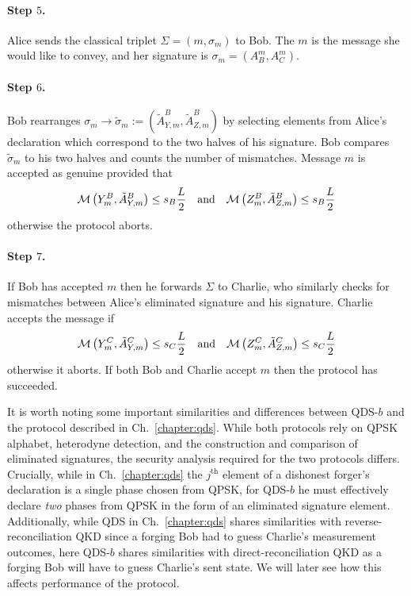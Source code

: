 \paragraph{Step $5$.} Alice sends the classical triplet $\Sigma = \left(m, \sigma_m\right)$ to Bob. The $m$ is the message she would like to convey, and her signature is $\sigma_m = \left(A_B^m, A_C^m\right)$. 

\paragraph{Step $6$.} Bob rearranges $\sigma_m \rightarrow \tilde{\sigma}_m := \left(\tilde{A}_{Y, m}^B, \tilde{A}_{Z, m}^B\right)$ by selecting elements from Alice's declaration which correspond to the two halves of his signature. Bob compares $\tilde{\sigma}_m$ to his two halves and counts the number of mismatches. Message $m$ is accepted as genuine provided that
\begin{equation}
\mathcal{M}\left(Y_m^B, \tilde{A}_{Y, m}^B\right) \le s_B \frac{L}{2} \qq{and} \mathcal{M}\left(Z_m^B, \tilde{A}_{Z, m}^B\right) \le s_B \frac{L}{2}
\end{equation}
otherwise the protocol aborts. %

\paragraph{Step $7$.} If Bob has accepted $m$ then he forwards $\Sigma$ to Charlie, who similarly checks for mismatches between Alice's eliminated signature and his signature. Charlie accepts the message if
\begin{equation}
\mathcal{M}\left(Y_m^C, \tilde{A}_{Y, m}^C\right) \le s_C \frac{L}{2} \qq{and} \mathcal{M}\left(Z_m^C, \tilde{A}_{Z, m}^C\right) \le s_C \frac{L}{2}
\end{equation}
otherwise it aborts. %
If both Bob and Charlie accept $m$ then the protocol has succeeded. 

It is worth noting some important similarities and differences between QDS-$b$ and the protocol described in Ch.~\ref{chapter:qds}. While both protocols rely on QPSK alphabet, heterodyne detection, and the construction and comparison of eliminated signatures, the security analysis required for the two protocols differs. Crucially, while in Ch.~\ref{chapter:qds} the $j^{\text{th}}$ element of a dishonest forger's declaration is a single phase chosen from QPSK, for QDS-$b$ he must effectively declare \emph{two} phases from QPSK in the form of an eliminated signature element. Additionally, while QDS in Ch.~\ref{chapter:qds} shares similarities with reverse-reconciliation QKD since a forging Bob had to guess Charlie's measurement outcomes, here QDS-$b$ shares similarities with direct-reconciliation QKD as a forging Bob will have to guess Charlie's sent state. We will later see how this affects performance of the protocol. 

